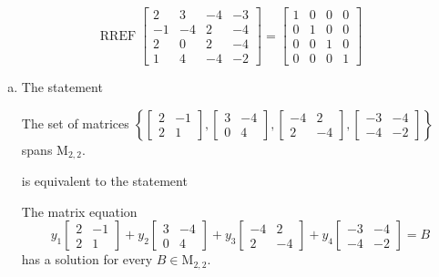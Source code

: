\begin{exerciseAnswer} 


\[\operatorname{RREF} \left[\begin{array}{cccc}
2 & 3 & -4 & -3 \\
-1 & -4 & 2 & -4 \\
2 & 0 & 2 & -4 \\
1 & 4 & -4 & -2
\end{array}\right] = \left[\begin{array}{cccc}
1 & 0 & 0 & 0 \\
0 & 1 & 0 & 0 \\
0 & 0 & 1 & 0 \\
0 & 0 & 0 & 1
\end{array}\right] \]


\begin{enumerate}[(a)]
\item The statement 
\begin{center}\begin{minipage}{0.8\textwidth}
 The set of matrices \( \left\{ \left[\begin{array}{cc}
2 & -1 \\
2 & 1
\end{array}\right] , \left[\begin{array}{cc}
3 & -4 \\
0 & 4
\end{array}\right] , \left[\begin{array}{cc}
-4 & 2 \\
2 & -4
\end{array}\right] , \left[\begin{array}{cc}
-3 & -4 \\
-4 & -2
\end{array}\right] \right\} \) spans \(\mathrm{M}_{2,2}\). 
\end{minipage}\end{center}
     is equivalent to the statement 
\begin{center}\begin{minipage}{0.8\textwidth}
 The matrix equation \[ y_{1} \left[\begin{array}{cc}
2 & -1 \\
2 & 1
\end{array}\right] + y_{2} \left[\begin{array}{cc}
3 & -4 \\
0 & 4
\end{array}\right] + y_{3} \left[\begin{array}{cc}
-4 & 2 \\
2 & -4
\end{array}\right] + y_{4} \left[\begin{array}{cc}
-3 & -4 \\
-4 & -2
\end{array}\right] =B\] has a solution for every \(B \in \mathrm{M}_{2,2}\). 
\end{minipage}\end{center}
    

\end{enumerate}
\end{exerciseAnswer}
